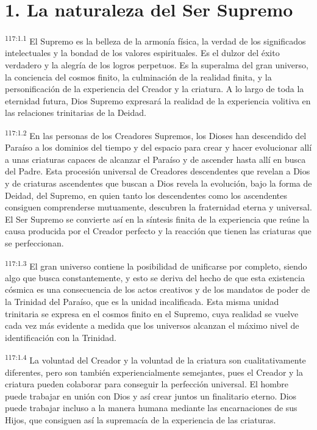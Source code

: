 \section*{1. La naturaleza del Ser Supremo}
\par
\textsuperscript{117:1.1} El Supremo es la belleza de la armonía física, la verdad de los significados intelectuales y la bondad de los valores espirituales. Es el dulzor del éxito verdadero y la alegría de los logros perpetuos. Es la superalma del gran universo, la conciencia del cosmos finito, la culminación de la realidad finita, y la personificación de la experiencia del Creador y la criatura. A lo largo de toda la eternidad futura, Dios Supremo expresará la realidad de la experiencia volitiva en las relaciones trinitarias de la Deidad.

\par
\textsuperscript{117:1.2} En las personas de los Creadores Supremos, los Dioses han descendido del Paraíso a los dominios del tiempo y del espacio para crear y hacer evolucionar allí a unas criaturas capaces de alcanzar el Paraíso y de ascender hasta allí en busca del Padre. Esta procesión universal de Creadores descendentes que revelan a Dios y de criaturas ascendentes que buscan a Dios revela la evolución, bajo la forma de Deidad, del Supremo, en quien tanto los descendentes como los ascendentes consiguen comprenderse mutuamente, descubren la fraternidad eterna y universal. El Ser Supremo se convierte así en la síntesis finita de la experiencia que reúne la causa producida por el Creador perfecto y la reacción que tienen las criaturas que se perfeccionan.

\par
\textsuperscript{117:1.3} El gran universo contiene la posibilidad de unificarse por completo, siendo algo que busca constantemente, y esto se deriva del hecho de que esta existencia cósmica es una consecuencia de los actos creativos y de los mandatos de poder de la Trinidad del Paraíso, que es la unidad incalificada. Esta misma unidad trinitaria se expresa en el cosmos finito en el Supremo, cuya realidad se vuelve cada vez más evidente a medida que los universos alcanzan el máximo nivel de identificación con la Trinidad.

\par
\textsuperscript{117:1.4} La voluntad del Creador y la voluntad de la criatura son cualitativamente diferentes, pero son también experiencialmente semejantes, pues el Creador y la criatura pueden colaborar para conseguir la perfección universal. El hombre puede trabajar en unión con Dios y así crear juntos un finalitario eterno. Dios puede trabajar incluso a la manera humana mediante las encarnaciones de sus Hijos, que consiguen así la supremacía de la experiencia de las criaturas.

